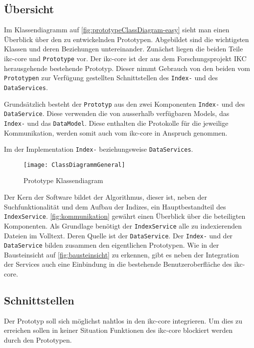 \subsection{Übersicht}


Im Klassendiagramm auf \autoref{fig:prototypeClassDiagram-easy} sieht man einen Überblick über den zu entwickelnden Prototypen. Abgebildet sind die wichtigsten Klassen und deren Beziehungen untereinander. Zunächst liegen die beiden Teile \gls{ikc-core} und \texttt{Prototype} vor. Der \gls{ikc-core} ist der aus dem Forschungsprojekt \gls{IKC} herausgehende bestehende Prototyp. Dieser nimmt Gebrauch von den beiden vom \texttt{Prototypen} zur Verfügung gestellten Schnittstellen des \texttt{Index-} und des \texttt{DataServices}.

Grundsätzlich besteht der \texttt{Prototyp} aus den zwei Komponenten \texttt{Index-} und des \texttt{DataService}. Diese verwenden die von ausserhalb ver\-füg\-bar\-en Models, das \texttt{In\-dex-} und das \texttt{DataModel}. Diese enthalten die Protokolle für die jeweilige Kommunikation, werden somit auch vom \gls{ikc-core} in Anspruch genommen.

Im der Implementation \texttt{Index-} beziehungsweise \texttt{DataServices}.

    \begin{figure}[H]
    \centering
    \texttt{[image: ClassDiagrammGeneral]}
    \caption{Prototype Klassendiagram}
    \label{fig:prototypeClassDiagram-easy}
    \end{figure}

Der Kern der Software bildet der Algorithmus, dieser ist, neben der Suchfunktionalität und dem Aufbau der Indizes, ein Hauptbestandteil des \texttt{IndexService}. \autoref{fig:kommunikation} gewährt einen Überblick über die beteiligten Komponenten. Als Grundlage benötigt der \texttt{In\-dex\-Ser\-vice} alle zu indexierenden Dateien im Volltext. Deren Quelle ist der \texttt{Data\-Ser\-vice}. Der \texttt{Index-} und der \texttt{DataService} bilden zusammen den eigentlichen Prototypen. Wie in der Bausteinsicht auf \autoref{fig:bausteinsicht} zu erkennen, gibt es neben der Integration der Services auch eine Einbindung in die bestehende Benutzeroberfläche des \gls{ikc-core}.


\subsection{Schnittstellen}
Der Prototyp soll sich möglichst nahtlos in den \gls{ikc-core} integrieren. Um dies zu erreichen sollen in keiner Situation Funktionen des \gls{ikc-core} blockiert werden durch den Prototypen. 


